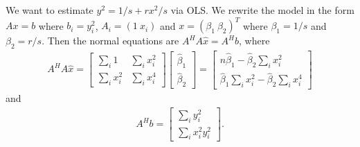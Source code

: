 \documentclass[letterpaper,12pt]{article}
\theoremstyle{definition}
\newenvironment{problem}[2][Problem]{\begin{trivlist}
\item[\hskip \labelsep {\bfseries #1}\hskip \labelsep {\bfseries #2.}]}{\end{trivlist}}
\begin{document}
\begin{problem}{48}
\end{problem} \begin{problem}{50}
We want to estimate $y^2=1/s+rx^2/s$ via OLS.
We rewrite the model in the form $Ax=b$ where
$b_i=y_i^2$, $A_i=(1\ x_i)$ and $x=(\beta_1\ \beta_2)^T$ where $\beta_1=1/s$ and $\beta_2=r/s$.
Then the normal equations are $A^HA\hat{x}=A^Hb$, where
\begin{align*}
    A^HA\hat{x} =
    \begin{bmatrix}
        \sum_i 1 & \sum_ix_i^2\\
        \sum_ix_i^2& \sum_ix_i^4
    \end{bmatrix}
    \begin{bmatrix}
        \hat{\beta}_1\\ \hat{\beta}_2
    \end{bmatrix} =
    \begin{bmatrix}
        n\hat{\beta}_1 - \hat{\beta}_2\sum_i x_i^2\\
        \hat{\beta}_1\sum_ix_i^2 - \hat{\beta}_2\sum_ix_i^4
    \end{bmatrix}
\end{align*}
and
\begin{align*}
    A^Hb=
    \begin{bmatrix}
        \sum_i y_i^2\\
        \sum_i x_i^2y_i^2
    \end{bmatrix}.
\end{align*}
\end{problem}
\end{document}
